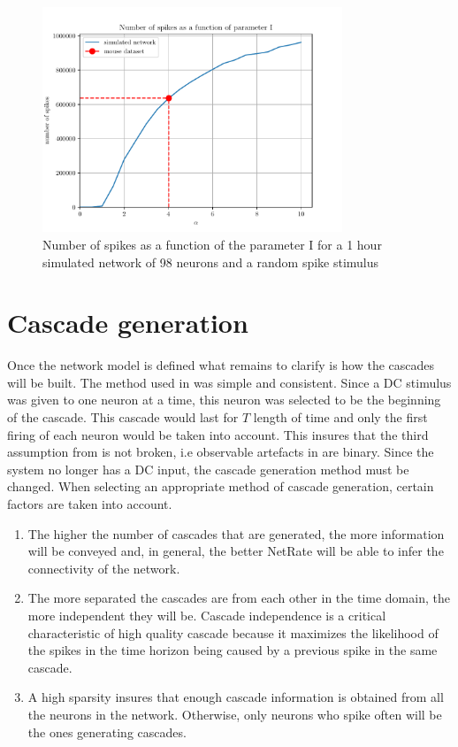 \begin{figure}[H]
	\centering
	\includegraphics[width=0.8\textwidth]{I_var_plot.pdf}
	\caption{Number of spikes as a function of the parameter I for a 1 hour simulated network of 98 neurons and a random spike stimulus}
	\label{fig:I_var_plot}
\end{figure}





\section{Cascade generation}\label{sec:simulating_cascade_generation}

Once the network model is defined what remains to clarify is how the cascades will be built. The method used in \cite{alexandru2018estimating} was simple and consistent. Since a DC stimulus was given to one neuron at a time, this neuron was selected to be the beginning of the cascade. This cascade would last for \(T\) length of time and only the first firing of each neuron would be taken into account. This insures that the third assumption from \cite{rodriguez2011uncovering} is not broken, i.e observable artefacts in are binary. Since the system no longer has a DC input, the cascade generation method must be changed. When selecting an appropriate method of cascade generation, certain factors are taken into account.
\begin{enumerate}
\item The higher the number of cascades that are generated, the more information will be conveyed and, in general, the better NetRate will be able to infer the connectivity of the network. 
\item The more separated the cascades are from each other in the time domain, the more independent they will be. Cascade independence is a critical characteristic of high quality cascade because it maximizes the likelihood of the spikes in the time horizon being caused by a previous spike in the same cascade.
\item A high sparsity insures that enough cascade information is obtained from all the neurons in the network. Otherwise, only neurons who spike often will be the ones generating cascades.
\end{enumerate}

